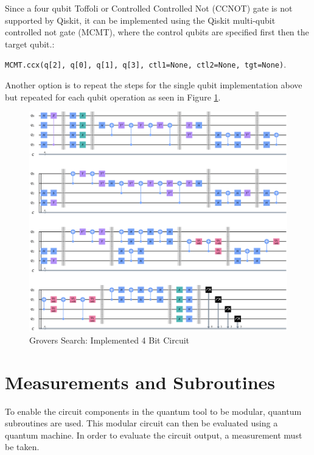 Since a four qubit Toffoli or Controlled Controlled Not (CCNOT) gate is not supported by Qiskit, it can be implemented %
using the Qiskit multi-qubit controlled not gate (MCMT), where the control qubits are specified first then the target qubit.:
 
 \texttt{MCMT.ccx(q[2], q[0], q[1], q[3], ctl1=None, ctl2=None, tgt=None)}.
 
Another option is to repeat the steps for the single qubit implementation above but repeated for each qubit operation as seen in Figure \ref{GrovCirImple4Bit}.

\begin{figure}[H]
      \centering
      \includegraphics[scale=0.4]{background/Grovers4Bits.png}
      \caption{Grovers Search: Implemented 4 Bit Circuit}
      \label{GrovCirImple4Bit}
\end{figure}

\section{Measurements and Subroutines}
To enable the circuit components in the quantum tool to be modular, quantum subroutines are used. This modular circuit can then be evaluated using a quantum machine. In order to evaluate the circuit output, a measurement must be taken. 

